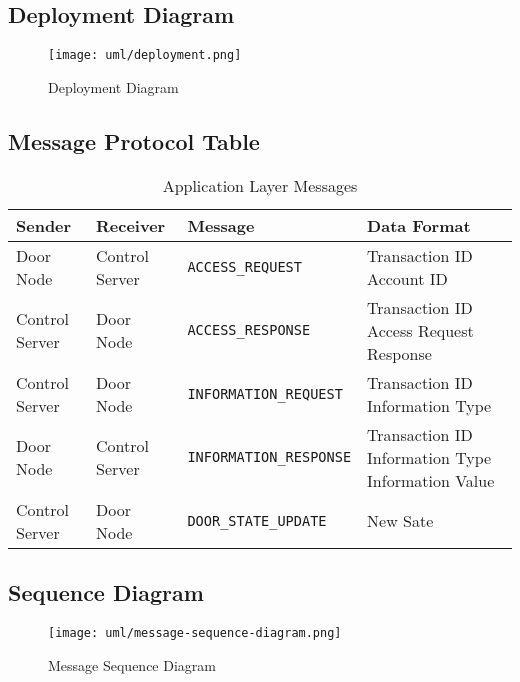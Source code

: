 \subsection{Deployment Diagram}

\begin{figure}[!htb]
\centering
\texttt{[image: uml/deployment.png]}
\caption{Deployment Diagram}
\label{fig:deployment-diagram}
\end{figure}

\subsection{Message Protocol Table}

\begin{table*}[htb]
\begin{tabular}{ l | l | l | p{4.5cm} }
\toprule
Sender & Receiver & Message & Data Format\\
\midrule
Door Node & Control Server & \verb|ACCESS_REQUEST| &
Transaction ID \newline Account ID\\
\hline
Control Server & Door Node & \verb|ACCESS_RESPONSE| &
Transaction ID \newline Access Request Response\\
\hline
Control Server & Door Node & \verb|INFORMATION_REQUEST| &
Transaction ID \newline Information Type\\
\hline
Door Node & Control Server & \verb|INFORMATION_RESPONSE| &
Transaction ID \newline Information Type \newline Information Value\\
\hline
Control Server & Door Node & \verb|DOOR_STATE_UPDATE| & New Sate\\
\bottomrule
\end{tabular}
\caption{Application Layer Messages}
\label{tab:app-layer-messages}
\end{table*}

\subsection{Sequence Diagram}

\begin{figure}[!htb]
\centering
\texttt{[image: uml/message-sequence-diagram.png]}
\caption{Message Sequence Diagram}
\label{fig:message-sequence-diagram}
\end{figure}
